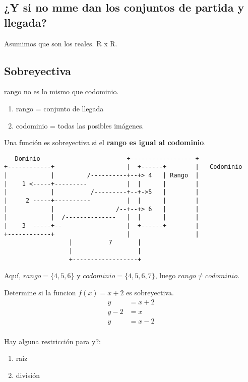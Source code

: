 \documentclass[11pt]{article}
\begin{document}
\subsection{¿Y si no mme dan los conjuntos de partida y llegada?}
\label{sec-1-2}
Asumimos que son los reales. R x R.

\subsection{Sobreyectiva}
\label{sec-1-3}
rango no es lo mismo que codominio.
\begin{enumerate}
\item rango = conjunto de llegada
\item codominio = todas las posibles imágenes.
\end{enumerate}

Una función es sobreyectiva si el \textbf{rango es igual al codominio}.
\begin{verbatim}
   Dominio                        +------------------+
+------------+                    |  +------+        |   Codominio
|            |         /----------+--+> 4   | Rango  |
|    1 <-----+---------           |  |      |        |
|            |          /---------+--+->5   |        |
|     2 -----+----------          |  |      |        |
|            |                 /--+--+> 6   |        |
|            |  /--------------   |  |      |        |
|    3  -----+--                  |  +------+        |
+------------+                    |                  |
				  |          7       |
				  |                  |
				  +------------------+
\end{verbatim}


Aquí, \(rango = \{4,5,6\}\) y \(codominio = \{4,5,6,7\}\), luego \(rango \neq codominio\).


Determine si la funcion \(f(x) = x + 2\) es sobreyectiva.
\begin{equation}
\begin{split}
 y  & = x + 2 \\
 y - 2 & = x \\
 y & = x - 2 \\
\end{split}

\end{equation}

Hay alguna restricción para y?:
\begin{enumerate}
\item raiz
\item división
\end{enumerate}
\end{document}
